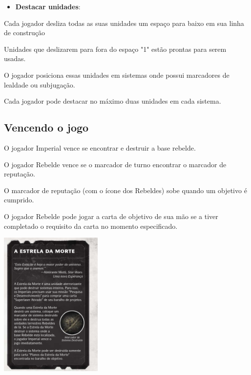 \documentclass[11pt]{article}
\begin{document}
\begin{itemize}
\item \textbf{Destacar unidades}:
\end{itemize}

Cada jogador desliza todas as suas unidades um espaço para baixo em sua linha de construção

Unidades que deslizarem para fora do espaço "1" estão prontas para serem usadas.

O jogador posiciona essas unidades em sistemas onde possui marcadores de lealdade ou subjugação.

Cada jogador pode destacar no máximo duas unidades em cada sistema.

\subsection{Vencendo o jogo}
\label{sec:org92ca5d7}

O jogador Imperial vence se encontrar e destruir a base rebelde.

O jogador Rebelde vence se o marcador de turno encontrar o marcador de reputação.

O marcador de reputação (com o ícone dos Rebeldes) sobe quando um objetivo é cumprido.

O jogador Rebelde pode jogar a carta de objetivo de sua mão se a tiver completado o requisito da carta no momento especificado.

\begin{center}
\includegraphics[width=2.0in]{./death-star.png}
\end{center}
\end{document}
